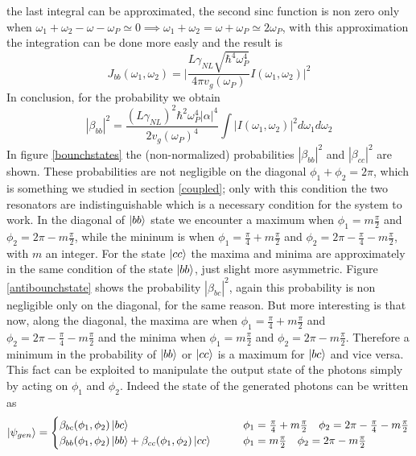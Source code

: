 the last integral can be approximated, the second sinc function is non zero only when $\omega_1+\omega_2 - \omega - \omega_P \simeq 0 \implies  \omega_1+\omega_2 = \omega + \omega_P \simeq 2\omega_P$, with this approximation the integration can be done more easly and the result is
\[J_{bb}(\omega_1,\omega_2) = \Bigg|\frac{L\gamma_{NL}\sqrt{\hbar^4\omega_P^4}}{4\pi v_g(\omega_P)}I(\omega_1,\omega_2)\Bigg|^2\]
In conclusion, for the probability we obtain
\[|\beta_{bb}|^2 = \frac{(L\gamma_{NL})^2\hbar^2\omega_{P}^4 |\alpha|^4}{2v_g(\omega_P)^4}\int |I(\omega_1,\omega_2)|^2d\omega_1 d\omega_2\]
In figure \ref{bounchstates} the (non-normalized) probabilities $|\beta_{bb}|^2$ and $|\beta_{cc}|^2$ are shown. These probabilities are not negligible on the diagonal $\phi_1 +\phi_2 = 2\pi$, which is something we studied in section \ref{coupled}; only with this condition the two resonators are indistinguishable which is a necessary condition for the system to work. In the diagonal of $\ket{bb}$ state we encounter a maximum when $\phi_1 = m\frac{\pi}{2}$ and $\phi_2 = 2\pi - m\frac{\pi}{2}$, while the mininum is when $\phi_1 = \frac{\pi}{4} + m\frac{\pi}{2}$ and $\phi_2 = 2\pi - \frac{\pi}{4} - m\frac{\pi}{2}$, with $m$ an integer. For the state $\ket{cc}$ the maxima and minima are approximately in the same condition of the state $\ket{bb}$, just slight more asymmetric. Figure \ref{antibounchstate} shows the probability $|\beta_{bc}|^2$, again this probability is non negligible only on the diagonal, for the same reason. But more interesting is that now, along the diagonal, the maxima are when $\phi_1 = \frac{\pi}{4} + m\frac{\pi}{2}$ and $\phi_2 = 2\pi - \frac{\pi}{4} - m\frac{\pi}{2}$ and the minima when $\phi_1 = m\frac{\pi}{2}$ and $\phi_2 = 2\pi - m\frac{\pi}{2}$. Therefore a minimum in the probability of $\ket{bb}$ or $\ket{cc}$ is a maximum for $\ket{bc}$ and vice versa. This fact can be exploited to manipulate the output state of the photons simply by acting on $\phi_1$ and $\phi_2$. Indeed the state of the generated photons can be written as
\[\ket{\psi_{gen}} = \begin{cases}
\beta_{bc}(\phi_1,\phi_2)\ket{bc} &\qquad  \phi_1 =  \frac{\pi}{4} + m\frac{\pi}{2} \quad \phi_2 = 2\pi - \frac{\pi}{4} - m\frac{\pi}{2} \\
\beta_{bb}(\phi_1,\phi_2)\ket{bb} +\beta_{cc}(\phi_1,\phi_2)\ket{cc} &\qquad \phi_1 = m\frac{\pi}{2} \quad \phi_2 = 2\pi - m\frac{\pi}{2} \\
\end{cases}\]

